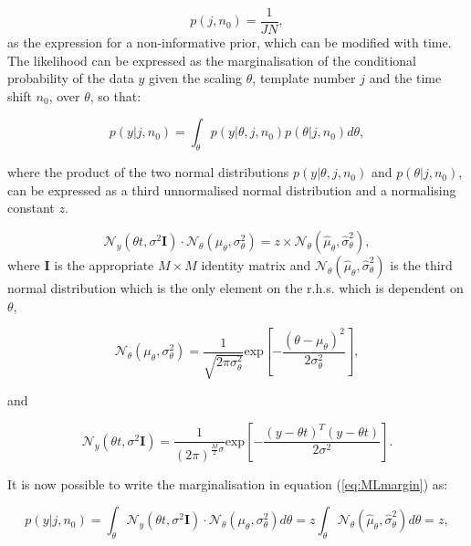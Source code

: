 \begin{equation}\label{eq:MLPrior}
p(j,n_0) = \frac{1}{JN},
\end{equation}
as the expression for a non-informative prior, which can be modified with time.
The likelihood can be expressed as the marginalisation of the conditional probability of the data $y$ given the scaling $\theta$, template number $j$ and the time shift $n_0$, over $\theta$, so that:

\begin{equation}\label{eq:MLmargin}
p(y|j,n_0)=\int_\theta p(y|\theta, j, n_0) p(\theta|j,n_0) d\theta,
\end{equation}

where the product of the two normal distributions $p(y|\theta, j, n_0)$ and $p(\theta|j,n_0)$, can be expressed as a third unnormalised normal distribution and a normalising constant $z$.

\begin{equation}\label{eq:MLprod1}
\mathcal{N}_y(\theta t,\sigma^2 \textbf{I})\cdot\mathcal{N}_\theta(\mu_\theta,\sigma^2_\theta) = z \times \mathcal{N}_\theta(\hat{\mu}_\theta,\hat{\sigma}^2_\theta),
\end{equation}
where $\textbf{I}$ is the appropriate $M \times M$ identity matrix and $\mathcal{N}_\theta(\hat{\mu}_\theta,\hat{\sigma}_\theta^2)$ is the third normal distribution which is the only element on the r.h.s. which is dependent on $\theta$,

\begin{equation}\label{eq:MLtheta2}
\mathcal{N}_\theta(\mu_\theta,\sigma^2_\theta) = \frac{1}{\sqrt{2 \pi \sigma_\theta^2}} \textrm{exp}\left[-\frac{\left(\theta - \mu_\theta\right)^2}{2\sigma_\theta^2}\right],
\end{equation}

and

\begin{equation}\label{eq:MLnoise2}
\mathcal{N}_y(\theta t,\sigma^2 \textbf{I}) = \frac{1}{\left(2 \pi\right)^{\frac{M}{2}\sigma}} \textrm{exp}\left[-\frac{\left(y - \theta t\right)^T\left(y - \theta t\right)}{2\sigma^2}\right].
\end{equation}

It is now possible to write the marginalisation in equation (\ref{eq:MLmargin}) as:

\begin{equation}\label{eq:MLmargin2}
p(y|j,n_0)=\int_\theta \mathcal{N}_y(\theta t,\sigma^2 \textbf{I})\cdot\mathcal{N}_\theta(\mu_\theta,\sigma^2_\theta) d\theta = z \int_\theta \mathcal{N}_\theta(\hat{\mu}_\theta,\hat{\sigma}^2_\theta) d\theta = z,
\end{equation}

